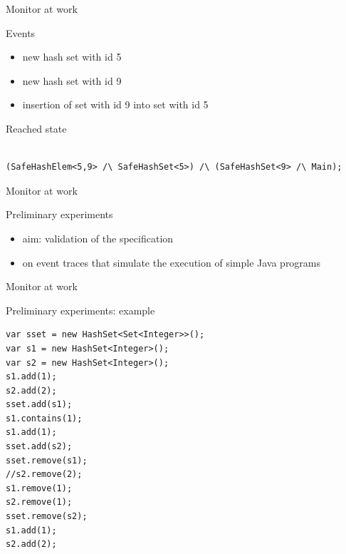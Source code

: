 \documentclass[10pt,usenames,dvipsnames]{beamer}
\begin{document}
\begin{frame}[fragile]{Monitor at work}
  \begin{block}{Events}
    \begin{itemize}
    \item  new hash set with id 5
    \item  new hash set with id 9
    \item insertion of set with id 9 into set with id 5  
    \end{itemize}
  \end{block}

  \begin{block}{Reached state}
    \begin{lstlisting}[basicstyle=\ttfamily\footnotesize]

(SafeHashElem<5,9> /\ SafeHashSet<5>) /\ (SafeHashSet<9> /\ Main);

    \end{lstlisting}
  \end{block}
\end{frame}


\begin{frame}[fragile]{Monitor at work}
  \begin{block}{Preliminary experiments}
    \begin{itemize}
    \item  aim: validation of the specification 
    \item  on event traces that simulate the  execution of simple Java programs
    \end{itemize}
  \end{block}
\end{frame}


\begin{frame}[fragile]{Monitor at work}
  \begin{block}{Preliminary experiments: example}
    \begin{lstlisting}[basicstyle=\ttfamily\footnotesize]
var sset = new HashSet<Set<Integer>>();
var s1 = new HashSet<Integer>();
var s2 = new HashSet<Integer>();
s1.add(1);
s2.add(2);
sset.add(s1);
s1.contains(1);
s1.add(1);
sset.add(s2);
sset.remove(s1);
//s2.remove(2);
s1.remove(1);
s2.remove(1);
sset.remove(s2);
s1.add(1);
s2.add(2);
    \end{lstlisting}
  \end{block}
\end{frame}
\end{document}
